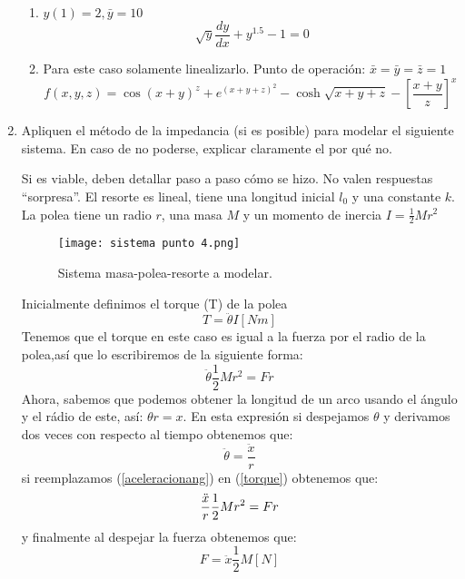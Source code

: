 \documentclass[letterpaper, 12pt]{article}
\begin{document}
\begin{enumerate}
\begin{enumerate}


\item $y(1)=2,\bar{y}=10$
\begin{equation}
     \sqrt[]{y}\frac{dy}{dx}+y^{1.5}-1 = 0
\end{equation}
    
\item Para este caso solamente linealizarlo. Punto de operación: $ \bar{x} = \bar{y} = \bar{z} = 1$
\begin{equation}
    f(x,y,z)=\cos(x+y)^z+e^{(x+y+z)^2}-\cosh{\sqrt{x+y+z}-\left[\frac{x+y}{z}\right]^x}
\end{equation}






\end{enumerate}
\item Apliquen el método de la impedancia (si es posible) para modelar el siguiente sistema. En caso de no poderse, explicar claramente el por qué no.

Si es viable, deben detallar paso a paso cómo se hizo. No valen respuestas “sorpresa”. El resorte es lineal, tiene una longitud inicial $l_0$ y una constante $k$. La polea tiene un radio $r$, una masa $M$ y un momento de inercia $I = \frac{1}{2}Mr^2$
\begin{figure}[H]
    \centering
    \texttt{[image: sistema punto 4.png]}
    \caption{Sistema masa-polea-resorte a modelar.}
    \label{fig:sistema punto 4}
\end{figure}

Inicialmente definimos el torque (T) de la polea
    \begin{equation}
    T=\ddot{\theta}I \left[Nm\right]
    \end{equation}
Tenemos que el torque en este caso es igual a la fuerza por el radio de la polea,así que lo escribiremos de la siguiente forma:
    \begin{equation}
    \ddot{\theta}\frac{1}{2}Mr^2=Fr
    \label{torque}
    \end{equation}
Ahora, sabemos que podemos obtener la longitud de un arco usando el ángulo y el rádio de este, así: $\theta r=x$.
En esta expresión si despejamos $\theta$ y derivamos dos veces con respecto al tiempo obtenemos que:
    \begin{equation}
    \ddot{\theta}=\frac{\ddot{x}}{r}
    \label{aceleracionang}
    \end{equation}
si reemplazamos (\ref{aceleracionang}) en (\ref{torque}) obtenemos que:
\begin{equation}
\notag
   \frac{\ddot{x}}{r}\frac{1}{2}Mr^2=Fr
    \end{equation}
y finalmente al despejar la fuerza obtenemos que: 
\begin{equation}
   F=\ddot{x}\frac{1}{2}M  \left[N\right]
    \end{equation}
    

\end{enumerate}
\end{document}
